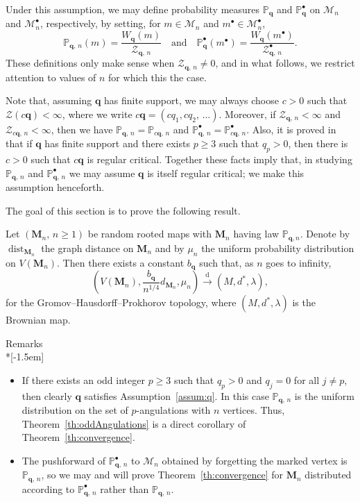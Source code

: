 \documentclass[AHL,Unicode,longabstracts,published]{cedram}
\newcommand{\bbP}{\mathbb{P}}
\newcommand{\bfq}{\mathbf{q}}
\newcommand{\cM}{\mathcal{M}}
\newcommand{\cZ}{\mathcal{Z}}
\newcommand{\bM}{\mathbf{M}}
\DeclareMathOperator{\dist}{dist}
\newcommand{\sbt}{{\ensuremath{\scriptscriptstyle\bullet}}}
\newcommand{\convdist}{\ensuremath{\stackrel{\mathrm{d}}{\rightarrow}}}
\begin{document}
Under this assumption, we may define probability measures $\bbP_{\bfq}$ and $\bbP^\bullet_{\bfq}$ on $\cM_n$ and $\cM_n^\bullet$, respectively, by setting, for $m\in \cM_n$ and $m^\sbt \in \cM_n^\sbt$,
\[
\bbP_{\bfq,\,n}(m) = \frac{W_{\bfq}(m)}{\cZ_{\bfq,\,n}}\quad \text{and}\quad\bbP^\bullet_{\bfq}(m^\sbt) = \frac{W_{\bfq}(m^\sbt)}{\cZ^\sbt_{\bfq,\,n}}.
\]
These definitions only make sense when $\cZ_{\bfq,\,n}\neq 0$, and in what follows, we restrict attention to values of $n$ for which this the case.


Note that, assuming $\bfq$ has finite support, we may always choose $c > 0$ such that $\cZ(c\bfq)<\infty$, where we write $c\bfq=(cq_1,cq_2,\,\ldots)$. Moreover, if $\cZ_{\bfq,\,n}< \infty$ and $\cZ_{c\bfq,\,n}<\infty$, then we have $\bbP_{\bfq,\,n}=\bbP_{c\bfq,\,n}$ and $\bbP_{\bfq,\,n}^\sbt=\bbP_{c\bfq,\,n}^\sbt$. Also, it is proved in~\cite[the Appendix]{CurienLeGallMiermontCactus} that if $\bfq$ has finite support and there exists $p\geq 3$ such that $q_p>0$, then there is $c>0$ such that $c\bfq$ is regular critical. Together these facts imply that, in studying $\bbP_{\bfq,\,n}$ and $\bbP_{\bfq,\,n}^\sbt$ we may assume $\bfq$ is itself regular critical; we make this assumption henceforth.

The goal of this section is to prove the following result.

\begin{theo}\label{th:convergence}
Let $(\bM_n,\,n \ge 1)$ be random rooted maps with $\bM_n$ having law $\bbP_{\bfq,n}$. Denote by $\dist_{\bM_n}$ the graph distance on $\bM_n$ and by $\mu_n$ the uniform probability distribution on $V(\bM_n)$. Then there exists a constant $b_\bfq$ such that, as $n$ goes to infinity,
\[
\left(V(\bM_n),\frac{b_{\bfq}}{n^{1/4}}d_{\bM_n},\mu_n\right) \convdist (M,d^*,\lambda),
\]
for the Gromov--Hausdorff--Prokhorov topology, where $(M,d^*,\lambda)$ is the Brownian map.
\end{theo}

\begin{enonce*}[plain]{Remarks}\ \\*[-1.5em]
\begin{itemize} 
 \item[$\star$] If there exists an odd integer $p\geq 3$ such that $q_p > 0 $ and $q_j = 0$ for all $j\neq p$, then clearly $\bfq$ satisfies Assumption~\ref{assum:q}. In this case $\bbP_{\bfq,\,n}$ is the uniform distribution on the set of $p$-angulations with $n$ vertices. Thus, Theorem~\ref{th:oddAngulations} is a direct corollary of Theorem~\ref{th:convergence}.
\item[$\star$] The pushforward of $\bbP^\bullet_{\bfq,\,n}$ to $\cM_n$ obtained by forgetting the marked vertex is $\bbP_{\bfq,\,n}$, so we may and will prove Theorem~\ref{th:convergence} for $\bM_n$ distributed according to $\bbP^\bullet_{\bfq,\,n}$ rather than $\bbP_{\bfq,\,n}$.
\end{itemize}
\end{enonce*}
\end{document}
